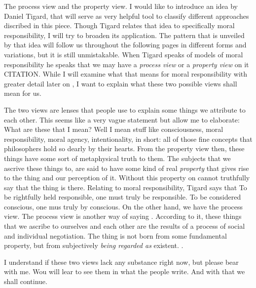 \documentclass{article}
\begin{document}
The process view and the property view.
I would like to introduce an idea by Daniel Tigard, that will serve as very
helpful tool to classify different approaches discribed in this piece. Though
Tigard relates that idea to specifically moral responsibility, I will try to
broaden its application. The pattern that is unveiled by that idea will follow
us throughout the following pages in different forms and variations, but it is
still unmistakable. When Tigard speaks of models of moral responsibility he
speaks that we may have a \textit{process view} or a \textit{property view} on
it CITATION. While I will examine what that means for moral responsibility with greater
detail later on
, I want to explain what these two possible views shall mean for us.

The two views are lenses that people use to explain some things we attribute to
each other. This seems like a very vague statement but allow me to elaborate:
What are these  that I mean? Well I mean stuff like consciousness,
moral responsibility, moral agency, intentionality, in short: all of those fine
concepts that philosophers hold so dearly by their hearts. From the property
view then, these things have some sort of metaphysical truth to them. The
subjects that we ascrive these things to, are said to have some kind of real
\textit{property} that gives rise to the thing and our perception of it. Without
this property on cannot truthfully say that the thing is there. Relating to
moral responsibility, Tigard says that 
To be rightfully held responsible, one must truly be responsible. To be
considered conscious, one mus truly by conscious. On the other hand, we have the
process view. The process view is another way of saying . According to it, these things that we ascribe to ourselves and each
other are the results of a process of social and individual negotiation. The
thing is not born from some fundamental property, but from subjectively
\textit{being regarded as} existent. .

I understand if these two views lack any substance right now, but please bear
with me. Wou will lear to see them in what the people write. And with that we
shall continue.

\end{document}
